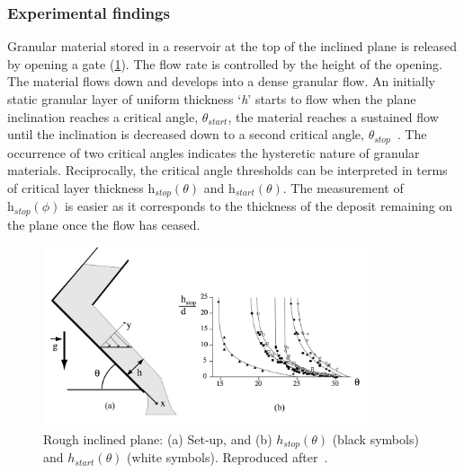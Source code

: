 \subsubsection{Experimental findings}

Granular material stored in a reservoir at the top of the inclined plane is 
released by opening a gate (\cref{fig:Incline}). The flow rate is controlled by 
the height of the opening. The material flows down and develops into a dense 
granular flow. An initially static granular layer of uniform thickness 
`\textit{h}' starts to flow when the plane inclination reaches a critical 
angle, $\theta_{\textit{start}}$, the material reaches a sustained flow until 
the inclination is decreased down to a second critical angle, 
$\theta_{\textit{stop}}$~\citep{Midi2004}. The occurrence of two critical 
angles indicates the hysteretic nature of granular materials. Reciprocally, the 
critical angle thresholds can be interpreted in terms of critical layer 
thickness $\textit{h}_{\textit{stop}}(\theta)$ and 
$\textit{h}_{\textit{start}}(\theta)$. The measurement of  
$\textit{h}_{\textit{stop}}(\phi)$ is easier as it corresponds to the thickness 
of the deposit remaining on the plane once the flow has ceased. 

\begin{figure}[tbhp]
\centering
\includegraphics[width=0.85\textwidth]{Incline}
\caption{Rough inclined plane: (a) Set-up, and (b) $h_{stop}(\theta)$ (black 
symbols) and $h_{start}(\theta)$ (white symbols). Reproduced 
after~\citep{Midi2004}.}
\label{fig:Incline}
\end{figure}


